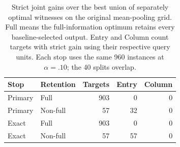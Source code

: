 \begin{table}[t]
\centering\small
\begin{tabular}{llrrr}
\toprule
Stop & Retention & Targets & Entry & Column \\
\midrule
Primary & Full & 903 & 0 & 0 \\
Primary & Non-full & 57 & 32 & 0 \\
Exact & Full & 903 & 0 & 0 \\
Exact & Non-full & 57 & 57 & 0 \\
\bottomrule
\end{tabular}
\caption{Strict joint gains over the best union of separately optimal witnesses on the original mean-pooling grid. Full means the full-information optimum retains every baseline-selected output. Entry and Column count targets with strict gain using their respective query units. Each stop uses the same 960 instances at $\alpha=.10$; the 40 splits overlap.}
\label{tab:evidence-regimes}
\end{table}
